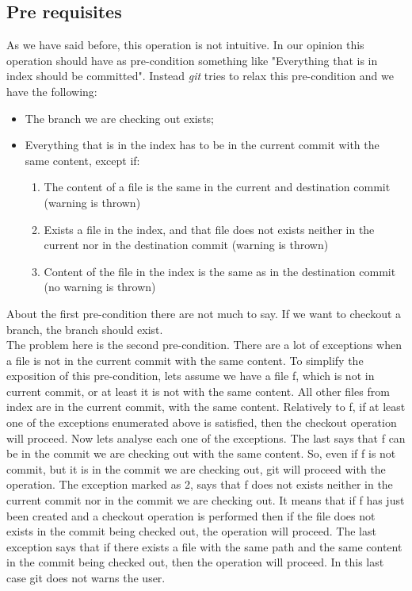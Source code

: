 \subsection{Pre requisites}
As we have said before, this operation is not intuitive. In our
opinion this operation should have as pre-condition something like
"Everything that is in index should be committed". Instead \emph{git}
tries to relax this pre-condition and we have the following:
\begin{itemize}
   \item The branch we are checking out exists;
   \item Everything that is in the index has to be in the current commit with the
      same content, except if:
      \begin{enumerate}
         \item The content of a file is the same in the
         current and destination commit (warning is thrown)
         \item Exists a file in the index, and that file does not exists
         neither in the current nor in the destination commit (warning is thrown)
         \item Content of the file in the index is the same as in the
         destination commit (no warning is thrown)
      \end{enumerate}
\end{itemize}

About the first pre-condition there are not much to say. If we want to
checkout a branch, the branch should exist.\\

The problem here is the second pre-condition. There are a lot of
exceptions when a file is not in the current commit with the same
content. To simplify the exposition of this pre-condition, lets assume
we have a file f, which is not in current commit, or at least it is not
with the same content. All other files from index are in the current commit, with
the same content. Relatively to f, if at least one of the exceptions enumerated above
is satisfied, then the checkout operation will proceed. Now lets
analyse each one of the exceptions. The last says that f can 
be in the commit we are checking out with the same content. So, even
if f is not commit, but it is in the commit we are checking out, git
will proceed with the operation. The exception marked as 2, says that
f does not exists neither in the current commit nor in the commit we
are checking out. It means that if f has just been created and a
checkout operation is performed then if the file does not exists in
the commit being checked out, the operation will proceed. The last
exception says that if there exists a file with the same path and the
same content in the commit being checked out, then the operation will
proceed. In this last case git does not warns the user.

